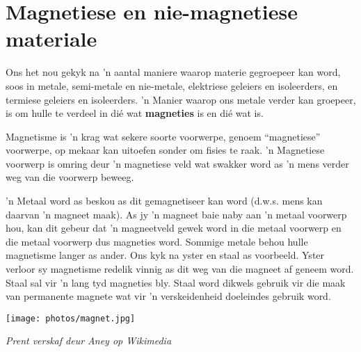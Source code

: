             \section{Magnetiese en nie-magnetiese materiale}
            \nopagebreak
      \label{m38706*id67151}Ons het nou gekyk na 'n aantal maniere waarop materie gegroepeer kan word, soos in metale, semi-metale en nie-metale, elektriese geleiers en isoleerders, en termiese geleiers en isoleerders. 'n Manier waarop ons metale verder kan groepeer, is om hulle te verdeel in di\'e wat \textbf{magneties} is en di\'e wat  is.\par 
{} 
\Definition{   \label{id2410309} { Magnetisme }} { \label{m38706*meaningfhsst!!!underscore!!!id570}
      \label{m38706*id67174}       Magnetisme is 'n krag wat sekere soorte voorwerpe, genoem ``magnetiese'' voorwerpe, op mekaar kan uitoefen sonder om fisies te raak. 'n Magnetiese voorwerp is omring deur 'n magnetiese veld wat swakker word as 'n mens verder weg van die voorwerp beweeg.\par 
       } 
\begin{minipage}{.5\textwidth}
      \label{m38706*id67186} 'n Metaal word as  beskou as dit gemagnetiseer kan word (d.w.s. mens kan daarvan 'n magneet maak). As jy 'n magneet baie naby aan 'n metaal voorwerp hou, kan dit gebeur dat 'n magneetveld gewek word in die metaal voorwerp en die metaal voorwerp dus magneties word. Sommige metale behou hulle magnetisme langer as ander. Ons kyk na yster en staal as voorbeeld. Yster verloor sy magnetisme redelik vinnig as dit weg van die magneet af geneem word. Staal sal vir 'n lang tyd magneties bly. Staal word dikwels gebruik vir die maak van permanente magnete wat vir 'n verskeidenheid doeleindes gebruik word.\par 
\end{minipage}
\begin{minipage}{.5\textwidth}
\begin{center}
 \texttt{[image: photos/magnet.jpg]}\par
\textit{Prent verskaf deur Aney op Wikimedia}
\end{center}
\end{minipage}\par
